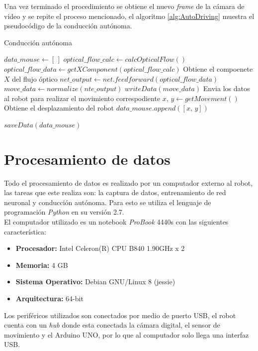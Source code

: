 \documentclass{iccmemoria}
\begin{document}
Una vez terminado el procedimiento se obtiene el nuevo \emph{frame} de la cámara de video y se repite el proceso mencionado, el algoritmo \ref{alg:AutoDriving} muestra el pseudocódigo de la conducción autónoma.\\

\begin{algorithm}[H]
\caption{Conducción autónoma}\label{alg:AutoDriving}
\begin{algorithmic}[1]
\State $data\_mouse \gets [\,]$
\State $optical\_flow\_calc \gets calcOpticalFlow()$ 
\State $optical\_flow\_data \gets getXComponent(optical\_flow\_calc)$ \Comment Obtiene el compoenete $X$ del flujo óptico
\State $net\_output \gets net.feedforward(optical\_flow\_data)$
\State $move\_data \gets normalize(nte\_output)$
\State $writeData(move\_data)$ \Comment Envia los datos al robot para realizar el movimiento correspodiente
\State $x,\, y \gets getMovement()$ \Comment Obtiene el desplazamiento del robot
\State $data\_mouse.append([x,\, y])$
\EndWhile

\State $saveData(data\_mouse)$
\EndFunction
\end{algorithmic}
\end{algorithm}

\section{Procesamiento de datos}

Todo el procesamiento de datos es realizado por un computador externo al robot, las tareas que este realiza son: la captura de datos, entrenamiento de red neuronal y conducción autónoma. Para esto se utiliza el lenguaje de programación \emph{Python} en su versión 2.7.\\

El computador utilizado es un notebook \emph{ProBook} 4440s con las siguientes característica:

\begin{itemize}
    \item {\bf Procesador:} Intel Celeron(R) CPU B840  1.90GHz x 2
    \item {\bf Memoria:} 4 GB
    \item {\bf Sistema Operativo:} Debian GNU/Linux 8 (jessie)
    \item {\bf Arquitectura: } 64-bit
\end{itemize}

Los periféricos utilizados son conectados por medio de puerto USB, el robot cuenta con un \emph{hub} donde esta conectada la cámara digital, el sensor de movimiento y el Arduino UNO, por lo que al computador solo llega una interfaz USB.\\
\end{document}
